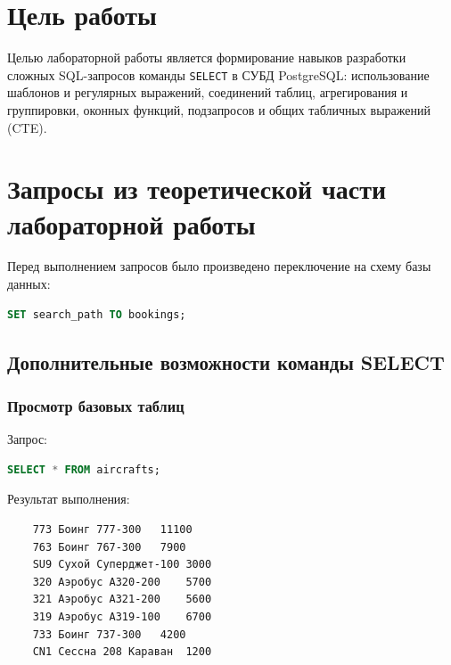 \documentclass{bmstu-sob}
\begin{document}
	
	
	
	\section{Цель работы}
	
	Целью лабораторной работы является формирование навыков разработки сложных SQL-запросов команды \texttt{SELECT} в СУБД PostgreSQL: использование шаблонов и регулярных выражений, соединений таблиц, агрегирования и группировки, оконных функций, подзапросов и общих табличных выражений (CTE).
	
	\section{Запросы из теоретической части лабораторной работы}
	
	Перед выполнением запросов было произведено переключение на схему базы данных:
	\begin{lstlisting}[language=SQL]
		SET search_path TO bookings;
	\end{lstlisting}
	
	\subsection{Дополнительные возможности команды SELECT}
	
	\subsubsection{Просмотр базовых таблиц}
	Запрос:
	\begin{lstlisting}[language=SQL]
		SELECT * FROM aircrafts;
	\end{lstlisting}
	Результат выполнения:
	\begin{lstlisting}
	773	Боинг 777-300	11100
	763	Боинг 767-300	7900
	SU9	Сухой Суперджет-100	3000
	320	Аэробус A320-200	5700
	321	Аэробус A321-200	5600
	319	Аэробус A319-100	6700
	733	Боинг 737-300	4200
	CN1	Сессна 208 Караван	1200
	
	\end{lstlisting}
	
\end{document}
